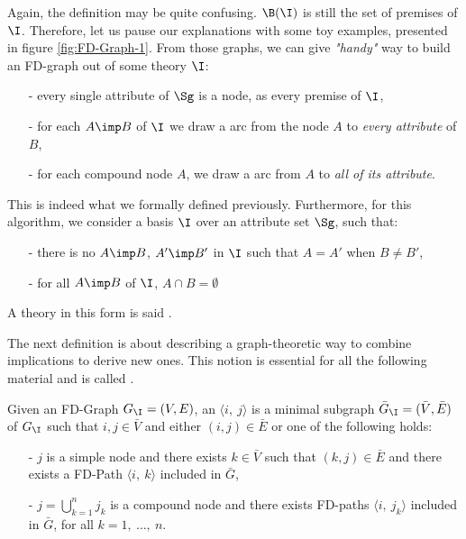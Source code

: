 Again, the definition may be quite confusing. $\B(\I)$ is still the set of premises of $\I$. Therefore, let us pause our explanations with some toy examples, presented in figure \ref{fig:FD-Graph-1}. 
From those graphs, we can give \textit{"handy"} way
to build an FD-graph out of some theory $\I$:
\begin{itemize}
	\item[-] every single attribute of $\Sg$ is a node, as every premise of $\I$,
	\item[-] for each $A \imp B$ of $\I$ we draw a  arc from the node
	$A$ to \textit{every attribute} of $B$,
	\item[-] for each compound node $A$, we draw a  arc from
	$A$ to \textit{all of its attribute}.
\end{itemize}
\noindent This is indeed what we formally defined previously. Furthermore, for
this algorithm, we consider a basis $\I$ over an attribute set $\Sg$, such that:
\begin{itemize}
	\item[-] there is no $A \imp B$, $A' \imp B'$ in $\I$ such that $A = A'$ when
	$B \neq B'$,
	\item[-] for all $A \imp B$ of $\I$, $A \cap B = \emptyset$
\end{itemize}
\noindent A theory in this form is said .

\begin{figure}[ht]
	
\end{figure}

\vspace{1.2em}

The next definition is about describing a graph-theoretic way to combine 
implications to derive new ones. This notion is essential for all the following 
material and is called .

\begin{definition} Given an FD-Graph $G_{\I} = (V, E)$, an
 $\langle i, \ j \rangle$ is a minimal subgraph 
$\bar{G}_{\I} = (\bar{V}, \bar{E})$ of $G_{\I}$ such that $i, j \in \bar{V}$ 
and either $(i, j) \in \bar{E}$ or one of the following holds:
\begin{itemize}
	\item[-] $j$ is a simple node and there exists $k \in \bar{V}$ such that 
	$(k, j) \in \bar{E}$ and there exists a FD-Path $\langle i, \ k \rangle$ 
	included in $\bar{G}$, 
	 
	\item[-] $j = \bigcup_{k = 1}^n j_k$ is a compound node and there exists 
	FD-paths $\langle i, \ j_k \rangle$ included in $\bar{G}$, for all $k = 
	1, \ \dots, \ n$.
\end{itemize}
	
\end{definition}

